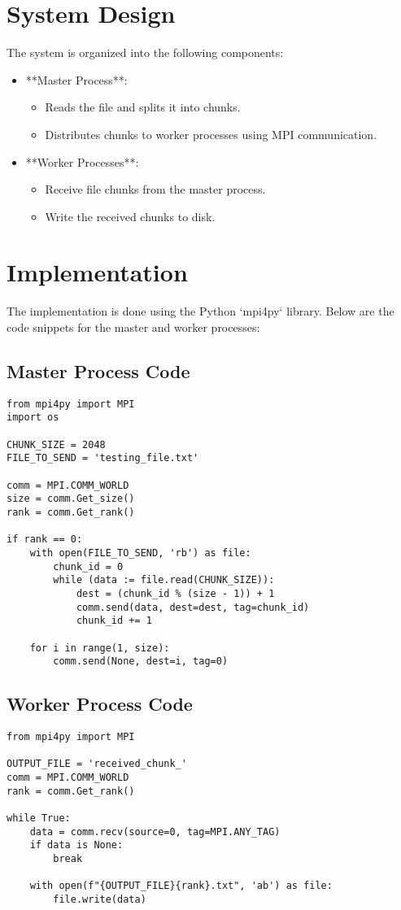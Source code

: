 \documentclass[a4paper,12pt]{article}
\begin{document}
\section*{System Design}
The system is organized into the following components:
\begin{itemize}
    \item **Master Process**:
          \begin{itemize}
              \item Reads the file and splits it into chunks.
              \item Distributes chunks to worker processes using MPI communication.
          \end{itemize}
    \item **Worker Processes**:
          \begin{itemize}
              \item Receive file chunks from the master process.
              \item Write the received chunks to disk.
          \end{itemize}
\end{itemize}

\section*{Implementation}
The implementation is done using the Python `mpi4py` library. Below are the code snippets for the master and worker processes:

\subsection*{Master Process Code}
\begin{lstlisting}
from mpi4py import MPI
import os

CHUNK_SIZE = 2048 
FILE_TO_SEND = 'testing_file.txt'

comm = MPI.COMM_WORLD
size = comm.Get_size()
rank = comm.Get_rank()

if rank == 0:
    with open(FILE_TO_SEND, 'rb') as file:
        chunk_id = 0
        while (data := file.read(CHUNK_SIZE)):
            dest = (chunk_id % (size - 1)) + 1
            comm.send(data, dest=dest, tag=chunk_id)
            chunk_id += 1

    for i in range(1, size):
        comm.send(None, dest=i, tag=0)  
\end{lstlisting}

\subsection*{Worker Process Code}
\begin{lstlisting}
from mpi4py import MPI

OUTPUT_FILE = 'received_chunk_'
comm = MPI.COMM_WORLD
rank = comm.Get_rank()

while True:
    data = comm.recv(source=0, tag=MPI.ANY_TAG)
    if data is None:
        break

    with open(f"{OUTPUT_FILE}{rank}.txt", 'ab') as file:
        file.write(data)
\end{lstlisting}
\end{document}
